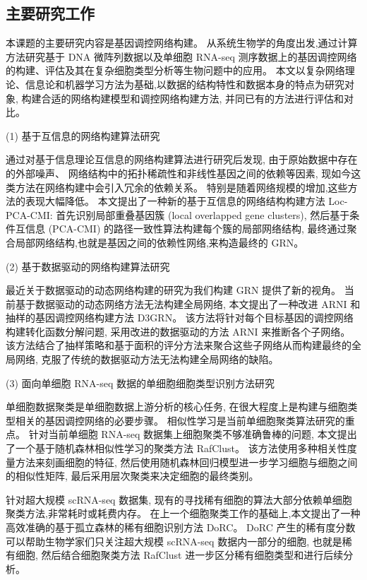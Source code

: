 \subsection{主要研究工作}
本课题的主要研究内容是基因调控网络构建。
从系统生物学的角度出发,通过计算方法研究基于 DNA 微阵列数据以及单细胞 RNA-seq 测序数据上的基因调控网络的构建、评估及其在复杂细胞类型分析等生物问题中的应用。
本文以复杂网络理论、信息论和机器学习方法为基础,以数据的结构特性和数据本身的特点为研究对象,
构建合适的网络构建模型和调控网络构建方法,
并同已有的方法进行评估和对比。

(1) 基于互信息的网络构建算法研究

通过对基于信息理论互信息的网络构建算法进行研究后发现,
由于原始数据中存在的外部噪声、
网络结构中的拓扑稀疏性和非线性基因之间的依赖等因素,
现如今这类方法在网络构建中会引入冗余的依赖关系。
特别是随着网络规模的增加,这些方法的表现大幅降低。
本文提出了一种新的基于互信息的网络结构构建方法 Loc-PCA-CMI:
首先识别局部重叠基因簇 (local overlapped gene clusters),
然后基于条件互信息 (PCA-CMI) 的路径一致性算法构建每个簇的局部网络结构,
最终通过聚合局部网络结构,也就是基因之间的依赖性网络,来构造最终的 GRN。

(2) 基于数据驱动的网络构建算法研究

最近关于数据驱动的动态网络构建的研究为我们构建 GRN 提供了新的视角。
当前基于数据驱动的动态网络方法无法构建全局网络,
本文提出了一种改进 ARNI 和抽样的基因调控网络构建方法 D3GRN。
该方法将针对每个目标基因的调控网络构建转化函数分解问题,
采用改进的数据驱动的方法 ARNI 来推断各个子网络。
该方法结合了抽样策略和基于面积的评分方法来聚合这些子网络从而构建最终的全局网络,
克服了传统的数据驱动方法无法构建全局网络的缺陷。

(3) 面向单细胞 RNA-seq 数据的单细胞细胞类型识别方法研究

单细胞数据聚类是单细胞数据上游分析的核心任务, 
在很大程度上是构建与细胞类型相关的基因调控网络的必要步骤。
相似性学习是当前单细胞聚类算法研究的重点。
针对当前单细胞 RNA-seq 数据集上细胞聚类不够准确鲁棒的问题,
本文提出了一个基于随机森林相似性学习的聚类方法 RafClust。
该方法使用多种相关性度量方法来刻画细胞的特征, 
然后使用随机森林回归模型进一步学习细胞与细胞之间的相似性矩阵,
最后采用层次聚类来决定细胞的最终类别。

针对超大规模 scRNA-seq 数据集,
现有的寻找稀有细胞的算法大部分依赖单细胞聚类方法,非常耗时或耗费内存。
在上一个细胞聚类工作的基础上,本文提出了一种高效准确的基于孤立森林的稀有细胞识别方法 DoRC。
DoRC 产生的稀有度分数可以帮助生物学家们只关注超大规模 scRNA-seq 数据内一部分的细胞, 也就是稀有细胞,
然后结合细胞聚类方法 RafClust 进一步区分稀有细胞类型和进行后续分析。


